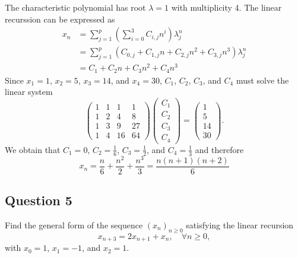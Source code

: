 The characteristic polynomial has root $ \lambda = 1 $ with multiplicity 4.
The linear recurssion can be expressed as
\begin{align*}
    x_n &= \sum_{j=1}^{p} \left( \sum_{i=0}^{3} C_{i,j} n^i \right) \lambda_j^n \\
        &= \sum_{j=1}^{p} \left( C_{0,j} + C_{1,j} n + C_{2,j} n^2 + C_{3,j} n^3 \right) \lambda_j^n \\
        &= C_1 + C_2 n + C_3 n^2 + C_4 n^3
\end{align*}
Since $ x_1 = 1 $, $ x_2 = 5 $, $ x_3 = 14 $, and $ x_4 = 30 $, $ C_1 $, $ C_2 $, $ C_3 $, and $ C_4 $ must solve the linear system
\begin{equation*}
    \begin{pmatrix}
        1 & 1 & 1 & 1 \\
        1 & 2 & 4 & 8 \\
        1 & 3 & 9 & 27 \\
        1 & 4 & 16 & 64
    \end{pmatrix}
    \begin{pmatrix}
        C_1 \\
        C_2 \\
        C_3 \\
        C_4
    \end{pmatrix}
    =
    \begin{pmatrix}
        1 \\
        5 \\
        14 \\
        30
    \end{pmatrix}.
\end{equation*}
We obtain that $ C_1 = 0 $, $ C_2 = \frac{1}{6} $, $ C_3 = \frac{1}{2} $, and $ C_4 = \frac{1}{3} $ and therefore
\begin{equation*}
    x_n = \frac{n}{6} + \frac{n^2}{2} + \frac{n^3}{3} = \frac{n (n + 1) (n + 2)}{6}
\end{equation*}

\subsection{Question 5}
Find the general form of the sequence $ (x_n)_{n \geq 0} $ satisfying the linear recursion
\begin{equation*}
    x_{n + 3} = 2 x_{n + 1} + x_n, \quad \forall n \geq 0,
\end{equation*}
with $ x_0 = 1 $, $ x_1 = -1 $, and $ x_2 = 1 $.

